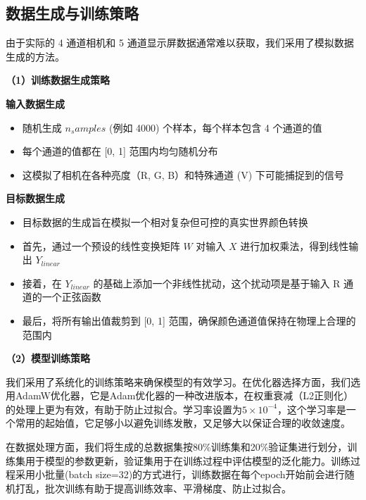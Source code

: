 \subsection[\hspace{-2pt}数据生成与训练策略]{{\heiti{} \hspace{-8pt}数据生成与训练策略}}\label{section2: 数据生成与训练策略}

由于实际的 4 通道相机和 5 通道显示屏数据通常难以获取，我们采用了模拟数据生成的方法。

\noindent\textbf{（1）训练数据生成策略}

 \textbf{输入数据生成}
\begin{itemize}
    \item 随机生成 $n_samples$ (例如 4000) 个样本，每个样本包含 4 个通道的值
    \item 每个通道的值都在 [0, 1] 范围内均匀随机分布
    \item 这模拟了相机在各种亮度（R, G, B）和特殊通道 (V) 下可能捕捉到的信号
\end{itemize}

 \textbf{目标数据生成}
\begin{itemize}
    \item 目标数据的生成旨在模拟一个相对复杂但可控的真实世界颜色转换
    \item 首先，通过一个预设的线性变换矩阵 $W$ 对输入 $X$ 进行加权乘法，得到线性输出 $Y_{linear}$
    \item 接着，在 $Y_{linear}$ 的基础上添加一个非线性扰动，这个扰动项是基于输入 R 通道的一个正弦函数
    \item 最后，将所有输出值裁剪到 [0, 1] 范围，确保颜色通道值保持在物理上合理的范围内
\end{itemize}

\noindent\textbf{（2）模型训练策略}

我们采用了系统化的训练策略来确保模型的有效学习。在优化器选择方面，我们选用AdamW优化器\cite{loshchilov2017decoupled}，它是Adam优化器\cite{kingma2014adam}的一种改进版本，在权重衰减（L2正则化）的处理上更为有效，有助于防止过拟合。学习率设置为$5 \times 10^{-4}$，这个学习率是一个常用的起始值，它足够小以避免训练发散，又足够大以保证合理的收敛速度。

在数据处理方面，我们将生成的总数据集按80\%训练集和20\%验证集进行划分，训练集用于模型的参数更新，验证集用于在训练过程中评估模型的泛化能力。训练过程采用小批量(batch size=32)的方式进行，训练数据在每个epoch开始前会进行随机打乱，批次训练有助于提高训练效率、平滑梯度、防止过拟合。


